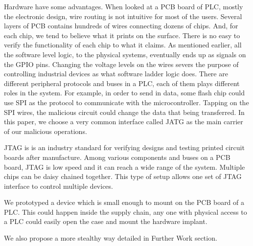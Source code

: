 Hardware have some advantages. When looked at a PCB board of PLC, mostly the electronic design, wire routing is not intuitive for most of the users. Several layers of PCB contains hundreds of wires connecting dozens of chips. And, for each chip, we tend to believe what it prints on the surface. There is no easy to verify the functionality of each chip to what it claims. As mentioned earlier, all the software level logic, to the physical systems, eventually ends up as signals on the GPIO pins. Changing the voltage levels on the wires severs the purpose of controlling industrial devices as what software ladder logic does. There are different peripheral protocols and buses in a PLC, each of them plays different roles in the system. For example, in order to send in data, some flash chip could use SPI as the protocol to communicate with the microcontroller. Tapping on the SPI wires, the malicious circuit could change the data that being transferred. In this paper, we choose a very common interface called JATG as the main carrier of our malicious operations.   

JTAG is is an industry standard for verifying designs and testing printed circuit boards after manufacture. Among various components and buses on a PCB board, JTAG is low speed and it can reach a wide range of the system. Multiple chips can be daisy chained together. This type of setup allows one set of JTAG interface to control multiple devices.

We prototyped a device which is small enough to mount on the PCB board of a PLC. This could happen inside the supply chain, any one with physical access to a PLC could easily open the case and mount the hardware implant.

We also propose a more stealthy way detailed in Further Work section.

